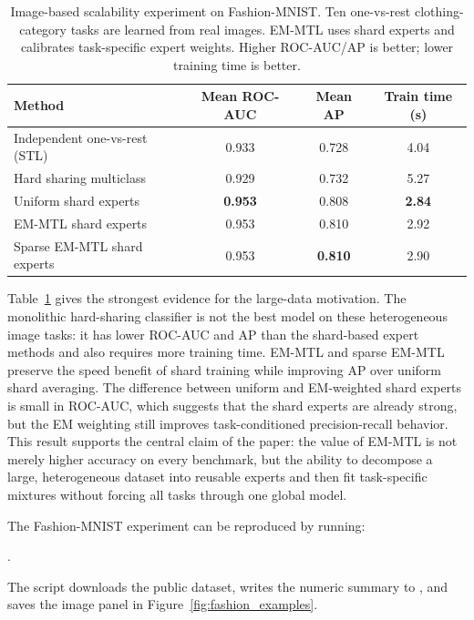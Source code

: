 \documentclass[preprint,12pt]{elsarticle}
\begin{document}
	\begin{table}[t]
		\centering
		\caption{Image-based scalability experiment on Fashion-MNIST. Ten
			one-vs-rest clothing-category tasks are learned from real images.
			EM-MTL uses shard experts and calibrates task-specific expert
			weights. Higher ROC-AUC/AP is better; lower training time is better.}
		\label{tab:fashion_mnist_scalability}
		\begin{tabular}{lccc}
			\toprule
			Method & Mean ROC-AUC & Mean AP & Train time (s) \\
			\midrule
			Independent one-vs-rest (STL) & 0.933 & 0.728 & 4.04 \\
			Hard sharing multiclass & 0.929 & 0.732 & 5.27 \\
			Uniform shard experts & \textbf{0.953} & 0.808 & \textbf{2.84} \\
			EM-MTL shard experts & 0.953 & 0.810 & 2.92 \\
			Sparse EM-MTL shard experts & 0.953 & \textbf{0.810} & 2.90 \\
			\bottomrule
		\end{tabular}
	\end{table}

	Table~\ref{tab:fashion_mnist_scalability} gives the strongest evidence
	for the large-data motivation. The monolithic hard-sharing classifier is
	not the best model on these heterogeneous image tasks: it has lower
	ROC-AUC and AP than the shard-based expert methods and also requires
	more training time. EM-MTL and sparse EM-MTL preserve the speed benefit
	of shard training while improving AP over uniform shard averaging. The
	difference between uniform and EM-weighted shard experts is small in
	ROC-AUC, which suggests that the shard experts are already strong, but
	the EM weighting still improves task-conditioned precision-recall
	behavior. This result supports the central claim of the paper: the value
	of EM-MTL is not merely higher accuracy on every benchmark, but the
	ability to decompose a large, heterogeneous dataset into reusable
	experts and then fit task-specific mixtures without forcing all tasks
	through one global model.

	The Fashion-MNIST experiment can be reproduced by running:
	\begin{center}
	.
	\end{center}
	The script downloads the public dataset, writes the numeric summary to
	, and
	saves the image panel in Figure~\ref{fig:fashion_examples}.
\end{document}
